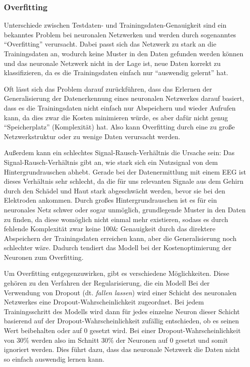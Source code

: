 \documentclass[10pt]{article}
\begin{document}
\subsubsection{Overfitting}

Unterschiede zwischen Testdaten- und Trainingsdaten-Genauigkeit sind ein bekanntes Problem bei neuronalen Netzwerken und werden durch sogenanntes \enquote{Overfitting} verursacht.
Dabei passt sich das Netzwerk zu stark an die Trainingsdaten an, wodurch keine Muster in den Daten gefunden werden können und das neuronale Netzwerk nicht in der Lage ist, neue Daten korrekt zu klassifizieren, da es die Trainingsdaten einfach nur \enquote{auswendig gelernt} hat.  %
 
Oft lässt sich das Problem darauf zurückführen, dass das Erlernen der Generalisierung der Datenerkennung eines neuronalen Netzwerkes darauf basiert, dass es die Trainingsdaten nicht einfach nur Abspeichern und wieder Aufrufen kann, da dies zwar die Kosten minimieren würde, es aber dafür nicht genug \enquote{Speicherplatz} (Komplexität) hat. Also kann Overfitting durch eine zu große Netzwerkstruktur oder zu wenige Daten verursacht werden.
 
Außerdem kann ein schlechtes Signal-Rausch-Verhältnis die Ursache sein: Das Signal-Rausch-Verhältnis gibt an, wie stark sich ein Nutzsignal von dem Hintergrundrauschen abhebt. 
Gerade bei der Datenermittlung mit einem EEG ist dieses Verhältnis sehr schlecht, da die für uns relevanten Signale aus dem Gehirn durch den Schädel und Haut stark abgeschwächt werden, bevor sie bei den Elektroden ankommen. 
Durch großes Hintergrundrauschen ist es für ein neuronales Netz schwer oder sogar unmöglich, grundlegende Muster in den Daten zu finden, da diese womöglich nicht einmal mehr existieren, sodass es durch fehlende Komplexität zwar keine 100\& Genauigkeit durch das direktere Abspeichern der Trainingsdaten erreichen kann, aber die Generalisierung noch schlechter wäre. 
Dadurch tendiert das Modell bei der Kostenoptimierung der Neuronen zum Overfitting.

Um Overfitting entgegenzuwirken, gibt es verschiedene Möglichkeiten. Diese gehören zu den Verfahren der Regularisierung, die ein Modell 
Bei der Verwendung von Dropout (dt. \textit{fallen lassen}) wird einer Schicht des neuronalen Netzwerkes eine Dropout-Wahrscheinlichkeit zugeordnet.
Bei jedem Trainingsschritt des Modells wird dann für jedes einzelne Neuron dieser Schicht basierend auf der Dropout-Wahrscheinlichkeit zufällig entschieden, ob es seinen Wert beibehalten oder auf 0 gesetzt wird. 
Bei einer Dropout-Wahrscheinlichkeit von 30\% werden also im Schnitt 30\% der Neuronen auf 0 gesetzt und somit ignoriert werden.  %
Dies führt dazu, dass das neuronale Netzwerk die Daten nicht so einfach auswendig lernen kann. %
\end{document}
